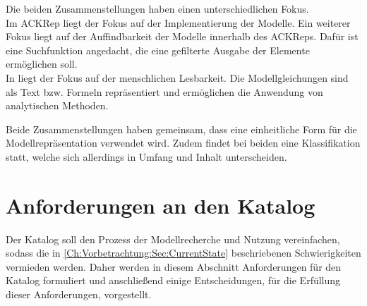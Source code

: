 Die beiden Zusammenstellungen haben einen unterschiedlichen Fokus.\\
Im ACKRep liegt der Fokus auf der Implementierung der Modelle. Ein weiterer Fokus liegt auf der Auffindbarkeit der Modelle innerhalb des ACKReps. Dafür ist eine Suchfunktion angedacht, die eine gefilterte Ausgabe der Elemente ermöglichen soll.\\
In \cite{LIYU13} liegt der Fokus auf der menschlichen Lesbarkeit. Die Modellgleichungen sind als Text bzw. Formeln repräsentiert und ermöglichen die Anwendung von analytischen Methoden. 

Beide Zusammenstellungen haben gemeinsam, dass eine einheitliche Form für die Modellrepräsentation verwendet wird. Zudem findet bei beiden eine Klassifikation statt, welche sich allerdings in Umfang und Inhalt unterscheiden.

\section{Anforderungen an den Katalog} 
\label{Ch:Vorbetrachtung:Sec:Anforderungen}

Der Katalog soll den Prozess der Modellrecherche und Nutzung vereinfachen, sodass die in \autoref{Ch:Vorbetrachtung:Sec:CurrentState} beschriebenen Schwierigkeiten vermieden werden. Daher werden in diesem Abschnitt Anforderungen für den Katalog formuliert und anschließend einige Entscheidungen, für die Erfüllung dieser Anforderungen, vorgestellt.

